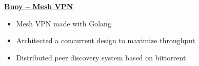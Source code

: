 \textbf{\href{https://github.com/prairir/Buoy}{Buoy -- Mesh VPN}} \par

\begin{itemize}
    \item Mesh VPN made with Golang
    \item Architected a concurrent design to maximize throughput
    \item Distributed peer discovery system based on bittorrent
\end{itemize}
